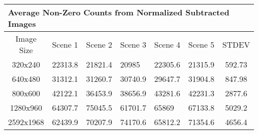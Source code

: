 \begin{table}[H]
\begin{tabular}{| c | l | l | l | l | l | c | }
\hline
\multicolumn{7}{|l|}{\bf Average Non-Zero Counts from Normalized Subtracted Images} \\
\hline
Image Size	&Scene 1		&Scene 2		&Scene 3		&Scene 4		&Scene 5		&STDEV\\\hline
320x240		&22313.8 	&21821.4 	&20985		&22305.6 	&21315.9 	&592.73\\
640x480 		&31312.1		&31260.7		&30740.9		&29647.7		&31904.8		&847.98\\
800x600    	&42122.1		&36453.9		&38656.9		&43281.6		&42231.3		&2877.6\\
1280x960    	&64307.7		&75045.5		&61701.7		&65869		&67133.8		&5029.2\\
2592x1968   	&62439.9		&70207.9		&74170.6		&65812.2		&71354.6		&4656.4\\\hline
\end{tabular}
\label{tab:normalised-images-short}
\end{table}
